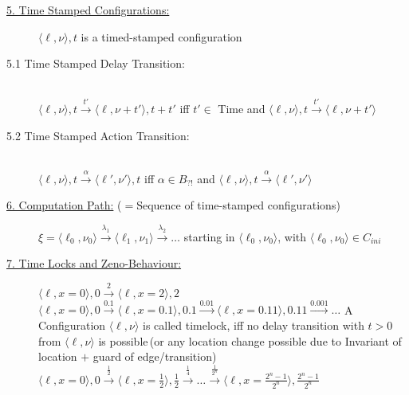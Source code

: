 \begin{tcolorbox}
\begin{description}
\item[\uline{5. Time Stamped Configurations:}] $\langle \ell, \nu \rangle, t$ is a timed-stamped configuration\\[-0.1cm]
\item[5.1 Time Stamped Delay Transition:] \hfill \\[-0.1cm]
$\langle \ell, \nu \rangle, t \xrightarrow{t'} \langle \ell, \nu + t' \rangle, t + t'$ \hfill iff $t' \in$ Time and $\langle \ell, \nu \rangle, t \xrightarrow{t'} \langle \ell, \nu + t'\rangle$
\item[5.2 Time Stamped Action Transition:] \hfill \\[-0.025cm]
$\langle \ell, \nu \rangle, t \xrightarrow{\alpha} \langle \ell', \nu' \rangle, t$ \hfill iff $ \alpha \in B_{?!}$ and $ \langle \ell, \nu \rangle, t \xrightarrow{\alpha} \langle \ell', \nu' \rangle$\\

\item[\uline{6. Computation Path:} ($=$Sequence of time-stamped configurations)]\hfill \newline
$\xi =  \langle \ell_0, \nu_0 \rangle \xrightarrow{\lambda_1} \langle \ell_1, \nu_1 \rangle \xrightarrow{\lambda_2} \ldots$ starting in $\langle \ell_0, \nu_0 \rangle$, with $\langle \ell_0, \nu_0 \rangle \in C_{ini}$

\item[\uline{7. Time Locks and Zeno-Behaviour:}]\hfill
{}
$\langle \ell, x=0 \rangle, 0 \xrightarrow{2} \langle \ell, x=2 \rangle, 2$ \newline
$\langle \ell, x=0 \rangle, 0 \xrightarrow{0.1} \langle \ell, x=0.1 \rangle, 0.1 \xrightarrow{0.01} \langle \ell, x=0.11 \rangle, 0.11 \xrightarrow{0.001} \ldots$ \newline
A Configuration $\langle \ell, \nu \rangle$ is called timelock, iff no delay transition with $t>0$ from $\langle \ell, \nu \rangle$ is possible\,(or any location change possible due to Invariant of location $+$ guard of edge/transition)\\
$\langle \ell, x=0 \rangle, 0 \xrightarrow{\frac{1}{2}} \langle \ell, x=\frac{1}{2} \rangle, \frac{1}{2} \xrightarrow{\frac{1}{4}} \ldots \xrightarrow{\frac{1}{2^n}} \langle \ell, x= \frac{2^n - 1}{2^n} \rangle, \frac{2^n - 1}{2^n}$


\end{description}
\end{tcolorbox}
